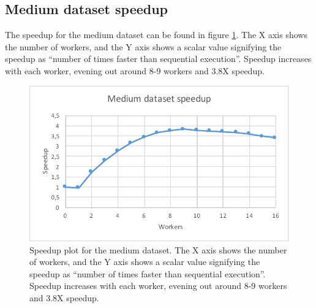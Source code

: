 \subsection{Medium dataset speedup}
The speedup for the medium dataset can be found in figure \ref{fig:dataset_3_speedup}.
The X axis shows the number of workers, and the Y axis shows a scalar value signifying the speedup as
``number of times faster than sequential execution''. Speedup increases with each worker, evening out around 8-9 workers and 3.8X speedup.
\begin{figure}[ht]
  \centering
  \includegraphics[width=120mm]{figures/dataset_3/dataset_3_speedup.pdf}
  \caption[Speedup plot for the medium dataset.]{Speedup plot for the medium dataset. The X axis shows the number of workers, and the Y axis shows a scalar value signifying the speedup as
  ``number of times faster than sequential execution''. Speedup increases with each worker, evening out around 8-9 workers and 3.8X speedup.}
  \label{fig:dataset_3_speedup}
\end{figure}

